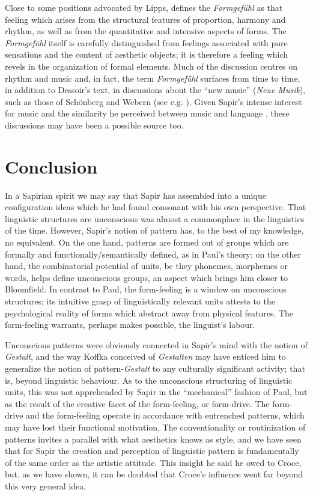 \documentclass[output=paper]{langscibook}
\begin{document}
Close to some positions advocated by Lipps, \citet{Dessoir1906} defines the \emph{Form\-gefühl} as that feeling which arises from the structural features of proportion, harmony and rhythm, as well as from the quantitative and intensive aspects of forms. The \emph{Formgefühl} itself is carefully distinguished from feelings associated with pure sensations and the content of aesthetic objects; it is therefore a feeling which revels in the organization of formal elements. Much of the discussion centres on rhythm and music and, in fact, the term \emph{Formgefühl} surfaces from time to time, in addition to Dessoir's text, in discussions about the ``new music'' (\emph{Neue Musik}), such as those of Schönberg and Webern (see e.g. \citealt{Webern1912}). Given Sapir's intense interest for music and the similarity he perceived between music and language \citep[156]{Darnell1990}, these discussions may have been a possible source too.

\section{Conclusion}
\label{sec:fortis:conc}

In a Sapirian spirit we may say that Sapir has assembled into a unique configuration ideas which he had found consonant with his own perspective. That linguistic structures are unconscious was almost a commonplace in the linguistics of the time. However, Sapir's notion of pattern has, to the best of my knowledge, no equivalent. On the one hand, patterns are formed out of groups which are formally and functionally/semantically defined, as in Paul's theory; on the other hand, the combinatorial potential of units, be they phonemes, morphemes or words, helps define unconscious groups, an aspect which brings him closer to Bloomfield. In contrast to Paul, the form-feeling is a window on unconscious structures; its intuitive grasp of linguistically relevant units attests to the psychological reality of forms which abstract away from physical features. The form-feeling warrants, perhaps makes possible, the linguist's labour.

Unconscious patterns were obviously connected in Sapir's mind with the notion of \emph{Gestalt}, and the way Koffka conceived of \emph{Gestalten} may have enticed him to generalize the notion of pattern-\emph{Gestalt} to any culturally significant activity; that is, beyond linguistic behaviour. As to the unconscious structuring of linguistic units, this was not apprehended by Sapir in the ``mechanical'' fashion of Paul, but as the result of the creative facet of the form-feeling, or form-drive. The form-drive and the form-feeling operate in accordance with entrenched patterns, which may have lost their functional motivation. The conventionality or routinization of patterns invites a parallel with what aesthetics knows as style, and we have seen that for Sapir the creation and perception of linguistic pattern is fundamentally of the same order as the artistic attitude. This insight he said he owed to Croce, but, as we have shown, it can be doubted that Croce's influence went far beyond this very general idea.
\end{document}
